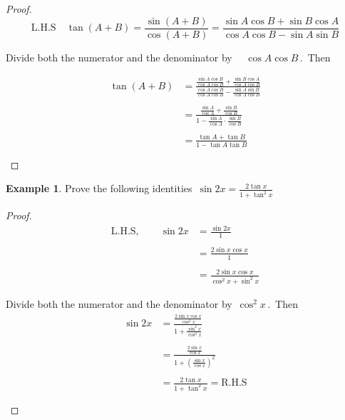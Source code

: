 \documentclass[11pt,a4paper]{article}
\theoremstyle{definition}
\newtheorem{example}[thm]{Example}
\begin{document}
\begin{proof}
$$\text{L.H.S}\quad \tan (A + B) = \frac{\sin (A+ B)}{\cos (A + B)} = \frac{\sin A\cos B + \sin B \cos A}{\cos A \cos B - \sin A \sin B}$$

Divide both the numerator and the denominator by $\quad  \cos A \cos B\,.\,$ Then

\begin{align*}
\tan (A + B) & = \frac{\frac{\sin A \cos B}{\cos A\cos B} + \frac{\sin B\cos A}{\cos A\cos B}}{\frac{\cos A \cos B}{\cos A\cos B} - \frac{\sin A\sin B}{\cos A\cos B}}\\\\
& = \frac{\frac{\sin A}{\cos A} + \frac{\sin B}{\cos B}}{1 - \frac{\sin A}{\cos A}\cdot\frac{\sin B}{\cos B}}\\\\
& = \frac{\tan A + \tan B}{1 - \tan A \tan B}\\\\
\end{align*}
\end{proof}

\begin{example}
Prove the following identities $\,\displaystyle{\sin 2 x  = \frac{2\tan x}{1 + \tan^2 x}}$
\end{example}

\begin{proof}
\begin{align*}
\text{L.H.S},\qquad  \sin 2 x & = \frac{\sin 2x}{1}\\\\
& = \frac{2\sin x \cos x}{1}\\\\
& = \frac{2\sin x \cos x}{\cos^2x + \sin^2x}
\end{align*}

Divide both the numerator and the denominator by $\, \cos^2x\,.\,$ Then 
\begin{align*}
\sin 2x & = \frac{\frac{2\sin x \cos x}{\cos^2x}}{1 + \frac{\sin^2x}{\cos^2x}}\\\\
& = \frac{\frac{2\sin x}{\cos x}}{1 + \left(\frac{\sin x}{\cos x}\right)^2}\\\\
& = \frac{2\tan x }{1 + \tan^2x} = \text{R.H.S}\\\\
\end{align*}
\end{proof}
\end{document}
